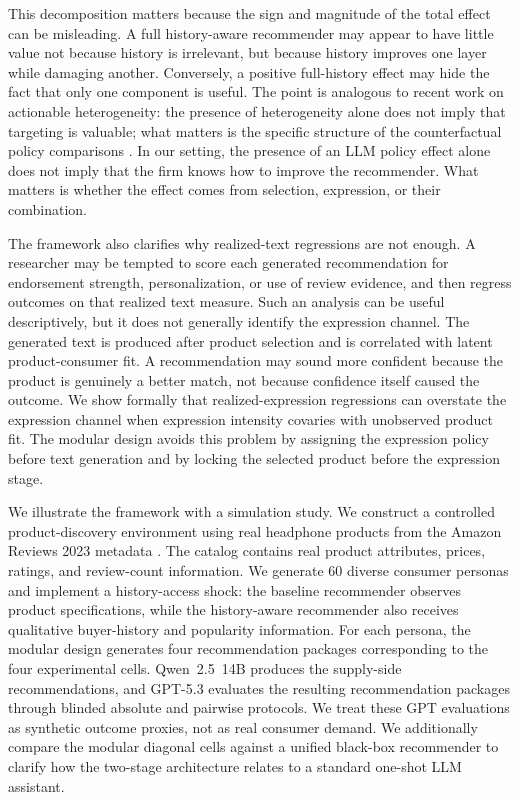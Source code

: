 \documentclass[11pt]{article}
\begin{document}
This decomposition matters because the sign and magnitude of the total effect can be misleading. A full history-aware recommender may appear to have little value not because history is irrelevant, but because history improves one layer while damaging another. Conversely, a positive full-history effect may hide the fact that only one component is useful. The point is analogous to recent work on actionable heterogeneity: the presence of heterogeneity alone does not imply that targeting is valuable; what matters is the specific structure of the counterfactual policy comparisons \citep{shchetkina2024actionable}. In our setting, the presence of an LLM policy effect alone does not imply that the firm knows how to improve the recommender. What matters is whether the effect comes from selection, expression, or their combination.

The framework also clarifies why realized-text regressions are not enough. A researcher may be tempted to score each generated recommendation for endorsement strength, personalization, or use of review evidence, and then regress outcomes on that realized text measure. Such an analysis can be useful descriptively, but it does not generally identify the expression channel. The generated text is produced after product selection and is correlated with latent product-consumer fit. A recommendation may sound more confident because the product is genuinely a better match, not because confidence itself caused the outcome. We show formally that realized-expression regressions can overstate the expression channel when expression intensity covaries with unobserved product fit. The modular design avoids this problem by assigning the expression policy before text generation and by locking the selected product before the expression stage.

We illustrate the framework with a simulation study. We construct a controlled product-discovery environment using real headphone products from the Amazon Reviews 2023 metadata \citep{hou2024amazon}. The catalog contains real product attributes, prices, ratings, and review-count information. We generate 60 diverse consumer personas and implement a history-access shock: the baseline recommender observes product specifications, while the history-aware recommender also receives qualitative buyer-history and popularity information. For each persona, the modular design generates four recommendation packages corresponding to the four experimental cells. Qwen~2.5~14B produces the supply-side recommendations, and GPT-5.3 evaluates the resulting recommendation packages through blinded absolute and pairwise protocols. We treat these GPT evaluations as synthetic outcome proxies, not as real consumer demand. We additionally compare the modular diagonal cells against a unified black-box recommender to clarify how the two-stage architecture relates to a standard one-shot LLM assistant.
\end{document}
